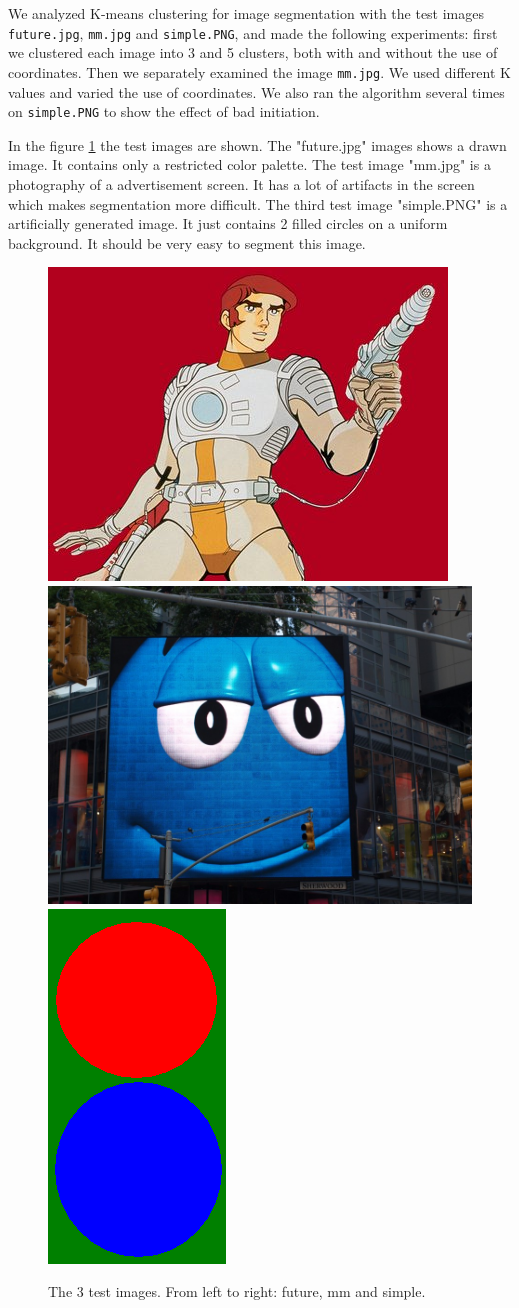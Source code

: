 We analyzed K-means clustering for image segmentation with the test images \texttt{future.jpg}, \texttt{mm.jpg} and \texttt{simple.PNG}, and made the following experiments: first we clustered each image into 3 and 5 clusters, both with and without the use of coordinates. Then we separately examined the image \texttt{mm.jpg}. We used different K values and varied the use of coordinates. We also ran the algorithm several times on \texttt{simple.PNG} to show the effect of bad initiation.

In the figure \ref{fig:testimages} the test images are shown. The "future.jpg" images shows a drawn image. It contains only a restricted color palette. The test image "mm.jpg" is a photography of a advertisement screen. It has a lot of artifacts in the screen which makes segmentation more difficult. The third test image "simple.PNG" is a artificially generated image. It just contains 2 filled circles on a uniform background. It should be very easy to segment this image.
\begin{figure}[h!]
	\includegraphics[width=0.38\linewidth]{figures/task2/future.jpg}
	\includegraphics[width=0.398\linewidth]{figures/task2/mm.jpg}
	\includegraphics[width=0.15\linewidth]{figures/task2/simple.PNG}
	\caption{The 3 test images. From left to right: future, mm and simple.}
	\label{fig:testimages}
\end{figure}

